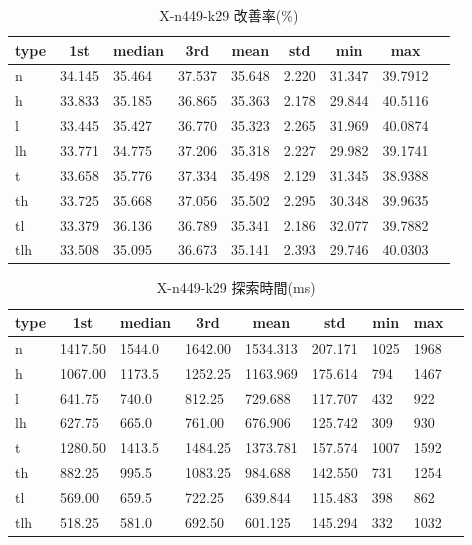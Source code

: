 \begin{table}[htbp]
    \caption{X-n449-k29 改善率(\%)}
    \begin{tabular}{|l|l|l|l|l|l|l|l|l|}\hline
    \multicolumn{1}{|c|}{\textbf{type}}
    &\multicolumn{1}{|c|}{\textbf{1st}}
    &\multicolumn{1}{c|}{\textbf{median}}
    &\multicolumn{1}{c|}{\textbf{3rd}}
    &\multicolumn{1}{c|}{\textbf{mean}}
    &\multicolumn{1}{c|}{\textbf{std}}
    &\multicolumn{1}{c|}{\textbf{min}}
    &\multicolumn{1}{c|}{\textbf{max}}\\\hline
	n & 34.145 & 35.464 & 37.537 & 35.648 & 2.220 & 31.347 & 39.7912\\\hline
	h & 33.833 & 35.185 & 36.865 & 35.363 & 2.178 & 29.844 & 40.5116\\\hline
	l & 33.445 & 35.427 & 36.770 & 35.323 & 2.265 & 31.969 & 40.0874\\\hline
	lh & 33.771 & 34.775 & 37.206 & 35.318 & 2.227 & 29.982 & 39.1741\\\hline
	t & 33.658 & 35.776 & 37.334 & 35.498 & 2.129 & 31.345 & 38.9388\\\hline
	th & 33.725 & 35.668 & 37.056 & 35.502 & 2.295 & 30.348 & 39.9635\\\hline
	tl & 33.379 & 36.136 & 36.789 & 35.341 & 2.186 & 32.077 & 39.7882\\\hline
	tlh & 33.508 & 35.095 & 36.673 & 35.141 & 2.393 & 29.746 & 40.0303\\\hline
	\end{tabular}
\end{table}
\begin{table}[htbp]
    \caption{X-n449-k29 探索時間(ms)}
    \begin{tabular}{|l|l|l|l|l|l|l|l|l|}\hline
    \multicolumn{1}{|c|}{\textbf{type}}
    &\multicolumn{1}{|c|}{\textbf{1st}}
    &\multicolumn{1}{c|}{\textbf{median}}
    &\multicolumn{1}{c|}{\textbf{3rd}}
    &\multicolumn{1}{c|}{\textbf{mean}}
    &\multicolumn{1}{c|}{\textbf{std}}
    &\multicolumn{1}{c|}{\textbf{min}}
    &\multicolumn{1}{c|}{\textbf{max}}\\\hline
	n & 1417.50 & 1544.0 & 1642.00 & 1534.313 & 207.171 & 1025 & 1968\\\hline
	h & 1067.00 & 1173.5 & 1252.25 & 1163.969 & 175.614 & 794 & 1467\\\hline
	l & 641.75 & 740.0 & 812.25 & 729.688 & 117.707 & 432 & 922\\\hline
	lh & 627.75 & 665.0 & 761.00 & 676.906 & 125.742 & 309 & 930\\\hline
	t & 1280.50 & 1413.5 & 1484.25 & 1373.781 & 157.574 & 1007 & 1592\\\hline
	th & 882.25 & 995.5 & 1083.25 & 984.688 & 142.550 & 731 & 1254\\\hline
	tl & 569.00 & 659.5 & 722.25 & 639.844 & 115.483 & 398 & 862\\\hline
	tlh & 518.25 & 581.0 & 692.50 & 601.125 & 145.294 & 332 & 1032\\\hline
	\end{tabular}
\end{table}
